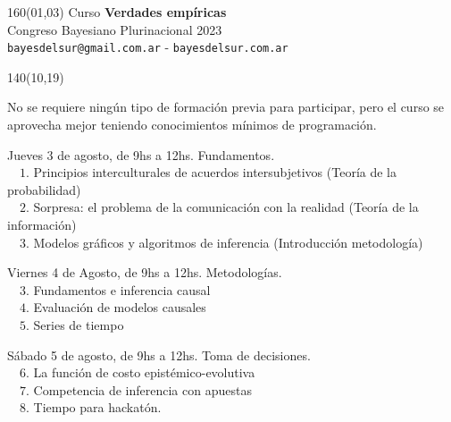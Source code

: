 \documentclass[shownotes,aspectratio=169]{beamer}
\begin{document}
\begin{frame}

\begin{textblock}{160}(01,03)\centering
\textcolor{black!85}{{\large
\large Curso \textbf{Verdades empíricas} \\[-0.1cm] \footnotesize Congreso Bayesiano Plurinacional 2023}} \\ \scriptsize \texttt{bayesdelsur@gmail.com.ar} - \texttt{bayesdelsur.com.ar}
\end{textblock}



\begin{textblock}{140}(10,19)

\normalsize
 No se requiere ningún tipo de formación previa para participar, pero el curso se aprovecha mejor teniendo conocimientos mínimos de programación.

\vspace{0.3cm}

\normalsize Jueves 3 de agosto, de 9hs a 12hs. Fundamentos. \\[0.1cm] \footnotesize
\ \ $1$. Principios interculturales de acuerdos intersubjetivos (Teoría de la probabilidad) \\
\ \ $2$. Sorpresa: el problema de la comunicación con la realidad (Teoría de la información) \\
\ \ $3$. Modelos gráficos y algoritmos de inferencia (Introducción metodología)\\

 \vspace{0.3cm}

\normalsize Viernes 4 de Agosto, de 9hs a 12hs. Metodologías.\scriptsize  \\[0.1cm] \footnotesize
\ \ $3$. Fundamentos e inferencia causal \\
\ \ $4$. Evaluación de modelos causales \\
\ \ $5$. Series de tiempo \\

\vspace{0.3cm}

\normalsize Sábado 5 de agosto, de 9hs a 12hs. Toma de decisiones.\scriptsize  \\[0.1cm] \footnotesize
\ \ $6$. La función de costo epistémico-evolutiva\\
\ \ $7$. Competencia de inferencia con apuestas \\
\ \ $8$. Tiempo para hackatón.

\end{textblock}

\end{frame}
\end{document}
